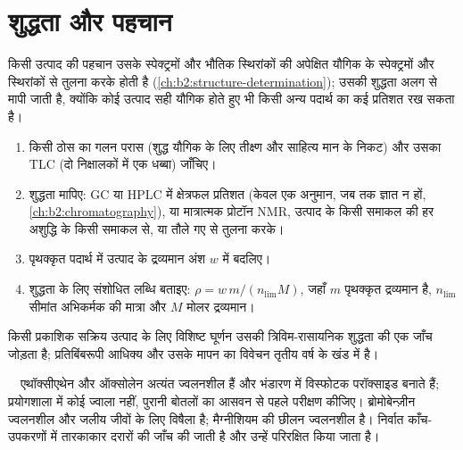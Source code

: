 \section{शुद्धता और पहचान}

किसी उत्पाद की पहचान उसके स्पेक्ट्रमों और भौतिक स्थिरांकों की अपेक्षित
यौगिक के स्पेक्ट्रमों और स्थिरांकों से तुलना करके होती है (\cref{ch:b2:structure-determination}); उसकी शुद्धता अलग से मापी जाती है, क्योंकि कोई उत्पाद
सही यौगिक होते हुए भी किसी अन्य पदार्थ का कई प्रतिशत रख सकता है।

\begin{method}[शुद्धता और लब्धि बताना]\label{met:b2:lab-techniques-2:purity}
\begin{enumerate}
  \item किसी ठोस का गलन परास (शुद्ध यौगिक के लिए तीक्ष्ण और साहित्य मान के निकट) और उसका
        TLC (दो निक्षालकों में एक धब्बा) जाँचिए।
  \item शुद्धता मापिए: GC या HPLC में क्षेत्रफल प्रतिशत (केवल एक अनुमान, जब तक  ज्ञात न हों,
        \cref{ch:b2:chromatography}), या मात्रात्मक प्रोटॉन NMR, उत्पाद के किसी समाकल की
        हर अशुद्धि के किसी समाकल से, या तौले गए  से तुलना करके।
  \item पृथक्कृत पदार्थ में उत्पाद के द्रव्यमान अंश $w$ में बदलिए।
  \item शुद्धता के लिए संशोधित लब्धि बताइए: $\rho = w\,m/(n_{\mathrm{lim}}M)$, जहाँ $m$
        पृथक्कृत द्रव्यमान है, $n_{\mathrm{lim}}$ सीमांत अभिकर्मक की मात्रा और $M$ मोलर द्रव्यमान।
\end{enumerate}
\end{method}

किसी प्रकाशिक सक्रिय उत्पाद के लिए विशिष्ट घूर्णन उसकी त्रिविम-रासायनिक शुद्धता की एक जाँच जोड़ता है;
प्रतिबिंबरूपी आधिक्य और उसके मापन का विवेचन तृतीय वर्ष के खंड में है।

\begin{safety}{\,\,\,\,}
एथॉक्सीएथेन और ऑक्सोलेन अत्यंत ज्वलनशील हैं और भंडारण में विस्फोटक परॉक्साइड बनाते हैं; प्रयोगशाला में
कोई ज्वाला नहीं, पुरानी बोतलों का आसवन से पहले परीक्षण कीजिए। ब्रोमोबेन्ज़ीन ज्वलनशील और जलीय जीवों के लिए
विषैला है; मैग्नीशियम की छीलन ज्वलनशील है। निर्वात काँच-उपकरणों में तारकाकार दरारों की जाँच की जाती है और उन्हें परिरक्षित किया जाता है।
\end{safety}

